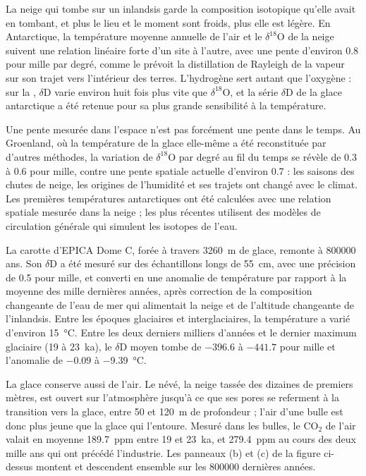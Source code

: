 La neige qui tombe sur un inlandsis garde la composition isotopique qu'elle avait en tombant, et plus le lieu et le moment
sont froids, plus elle est légère. En Antarctique, la température moyenne annuelle de l'air et le $\delta^{18}$O de la neige
suivent une relation linéaire forte d'un site à l'autre, avec une pente d'environ \num{0.8} pour mille par degré, comme le prévoit
la distillation de Rayleigh de la vapeur sur son trajet vers l'intérieur des terres. L'hydrogène sert autant que l'oxygène : sur la , $\delta$D varie environ huit fois plus vite
que $\delta^{18}$O, et
la série $\delta$D de la glace antarctique a été retenue pour sa plus grande sensibilité à la température.

Une pente mesurée dans l'espace n'est pas forcément une pente dans le temps. Au Groenland, où la température de la glace
elle-même a été reconstituée par d'autres méthodes, la variation de $\delta^{18}$O par degré au fil du temps se révèle
de 0.3 à \num{0.6} pour mille, contre une pente spatiale actuelle d'environ
\num{0.7} : les saisons des chutes de neige, les origines de l'humidité et ses trajets ont changé avec le
climat. Les premières températures antarctiques ont été calculées avec une relation spatiale mesurée dans la neige ;
les plus récentes utilisent des modèles de circulation générale qui simulent les isotopes de l'eau.

La carotte d'EPICA Dome C, forée à travers \qty{3260}{m} de glace, remonte à \num{800000} ans. Son
$\delta$D a été mesuré sur des échantillons longs de \qty{55}{cm}, avec une précision de \num{0.5} pour mille, et
converti en une anomalie de température par rapport à la moyenne des mille dernières années, après
correction de la composition changeante de l'eau de mer qui alimentait la neige et de l'altitude changeante de
l'inlandsis. Entre les époques glaciaires et interglaciaires, la température a varié d'environ
\qty{15}{\celsius}. Entre les deux derniers milliers d'années et le dernier maximum glaciaire (\num{19} à
\qty{23}{ka}), le $\delta$D moyen tombe de $-396.6$ à $-441.7$ pour mille et l'anomalie de $-0.09$ à
\qty{-9.39}{\celsius}.

La glace conserve aussi de l'air. Le névé, la neige tassée des dizaines de premiers mètres, est ouvert sur
l'atmosphère jusqu'à ce que ses pores se referment à la transition vers la glace, entre 50 et \qty{120}{m} de profondeur ;
l'air d'une bulle est donc plus jeune que la glace qui l'entoure. Mesuré dans les bulles, le CO$_2$ de l'air
valait en moyenne \qty{189.7}{ppm} entre \num{19} et \qty{23}{ka}, et \qty{279.4}{ppm} au cours des deux mille
ans qui ont précédé l'industrie. Les panneaux (b) et (c) de la figure ci-dessus montent et descendent
ensemble sur les \num{800000} dernières années.

